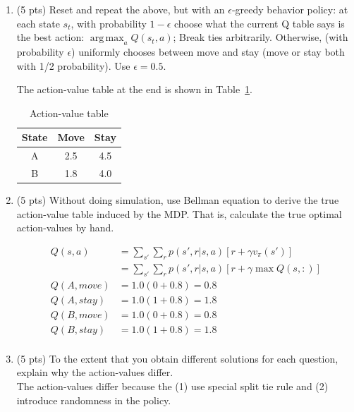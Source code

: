 \documentclass[a4paper]{article}
\theoremstyle{definition}
\DeclareMathOperator*{\argmax}{arg\,max}
\newenvironment{soln}{
    \leavevmode\color{blue}\ignorespaces
}{}
\begin{document}
\begin{enumerate}
\item (5 pts) Reset and repeat the above, but with an $\epsilon$-greedy behavior policy: at each state $s_t$, with probability $1-\epsilon$ choose what the current Q table says is the best action: $\argmax_a Q(s_t,a)$; Break ties arbitrarily. Otherwise, (with probability $\epsilon$) uniformly chooses between move and stay (move or stay both with 1/2 probability). Use $\epsilon=0.5$.
\begin{soln}
    The action-value table at the end is shown in Table~\ref{tab:q42}.
    \begin{table}[H]
        \centering
        \begin{tabular}{|c|c|c|}
            \hline
            State & Move & Stay\\
            \hline
            A & 2.5 & 4.5\\
            \hline
            B & 1.8 & 4.0\\
            \hline
        \end{tabular}
        \caption{Action-value table}
        \label{tab:q42}
    \end{table}
\end{soln}
\item (5 pts) Without doing simulation, use Bellman equation to derive the true action-value table induced by the MDP. That is, calculate the true optimal action-values by hand.
\begin{soln}
\begin{align*}
    Q(s, a) &= \sum_{s'}^{}\sum_{r}^{} p(s',r | s, a)[r+\gamma v_\pi (s')]\\
            &=  \sum_{s'}^{}\sum_{r}^{} p(s',r | s, a)[r+\gamma \max Q(s,:)]\\
    Q(A, move) &= 1.0(0+0.8)= 0.8\\
    Q(A, stay) &= 1.0(1+0.8)= 1.8\\
    Q(B, move) &= 1.0(0+0.8)= 0.8\\
    Q(B, stay) &= 1.0(1+0.8)= 1.8\\
\end{align*}
\end{soln}

\item (5 pts) To the extent that you obtain different solutions for each question, explain why the action-values  differ.
\begin{soln}\\
    The action-values differ because the (1) use special split tie rule and (2) introduce randomness in the policy.
\end{soln}

\end{enumerate}
\end{document}

